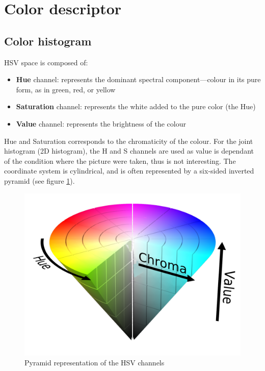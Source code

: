 \section{Color descriptor}
\subsection{Color histogram}

HSV space is composed of:
\begin{itemize}
    \item \textbf{Hue} channel: represents the dominant spectral component—colour in its pure form, as in green, red, or yellow
    \item \textbf{Saturation} channel: represents the white added to the pure color (the Hue)
    \item \textbf{Value} channel: represents the brightness of the colour
\end{itemize}

Hue and Saturation corresponds to the chromaticity of the colour. For the joint histogram (2D histogram), the H and S channels are used as value is dependant of the condition where the picture were taken, thus is not interesting. The coordinate system is cylindrical, and is often represented by a six-sided inverted pyramid (see figure \ref{fig:hsv_pyramid}).

\begin{figure}
    \centering
    \includegraphics[scale=0.2]{img/HSV_pyramid.png}
    \caption{Pyramid representation of the HSV channels}
    \label{fig:hsv_pyramid}
\end{figure}


